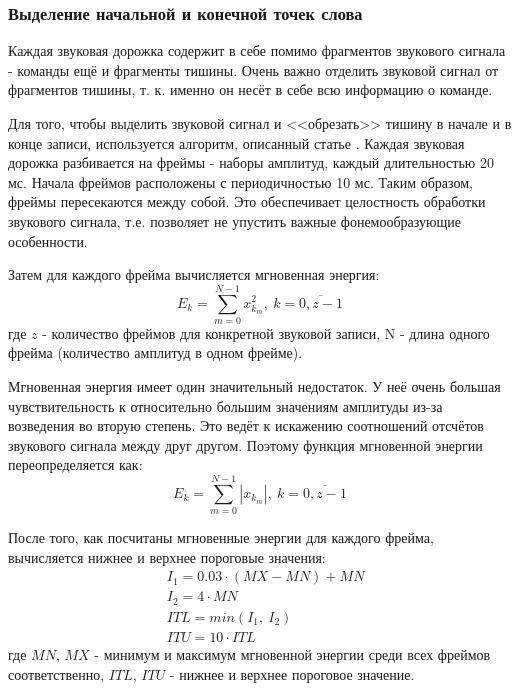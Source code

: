 \subsubsection{Выделение начальной и конечной точек слова}
Каждая звуковая дорожка содержит в себе помимо фрагментов звукового сигнала - команды ещё и фрагменты тишины. Очень важно отделить звуковой сигнал от фрагментов тишины, т. к. именно он несёт в себе всю информацию о команде. 

Для того, чтобы выделить звуковой сигнал и <<обрезать>> тишину в начале и в конце записи, используется алгоритм, описанный статье \cite{SignalPreprocessing}. 
Каждая звуковая дорожка разбивается на фреймы - наборы амплитуд, каждый длительностью 20 мс. Начала фреймов расположены с периодичностью 10 мс. Таким образом, фреймы пересекаются между собой. Это обеспечивает целостность обработки звукового сигнала, т.е. позволяет не упустить важные фонемообразующие особенности.

Затем для каждого фрейма вычисляется мгновенная энергия:
\begin{equation}
E_k = \sum_{m=0}^{N-1} x_{k_m}^2,~k=\overline{0,z-1}
\end{equation}
где $z$ - количество фреймов для конкретной звуковой записи, N - длина одного фрейма (количество амплитуд в одном фрейме).

Мгновенная энергия имеет один значительный недостаток. У неё очень большая чувствительность к относительно большим значениям амплитуды из-за возведения во вторую степень. Это ведёт к искажению соотношений отсчётов звукового сигнала между друг другом. Поэтому функция мгновенной энергии переопределяется как:
\begin{equation}
\label{eq:instant_energy}
E_k = \sum_{m=0}^{N-1} |x_{k_m}|,~k=\overline{0,z-1}
\end{equation}

После того, как посчитаны мгновенные энергии для каждого фрейма, вычисляется нижнее и верхнее пороговые значения:
\begin{equation}
\begin{aligned}
& I_1 = 0.03 \cdot (MX - MN) + MN \\
& I_2 = 4 \cdot MN \\
& ITL = min(I_1,~I_2)\\
& ITU = 10 \cdot ITL
\end{aligned}
\end{equation}
где $MN$, $MX$ - минимум и максимум мгновенной энергии среди всех фреймов соответственно, $ITL$, $ITU$ - нижнее и верхнее пороговое значение.

